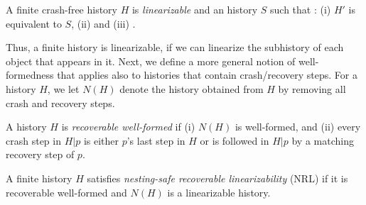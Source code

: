 \begin{definition} 
\label{Definition: Linearizability}
A finite crash-free history $H$ is \emph{linearizable} 
and an  history $S$ such that :
(i) $H'$ is equivalent to $S$,
(ii)  and
(iii) .
\end{definition}

Thus, a finite history is linearizable, if we can linearize the subhistory
of each object that appears in it.
Next, we define a more general notion of well-formedness that applies also
to histories that contain crash/recovery steps. For a history $H$,
we let $N(H)$ denote the history obtained from $H$ by removing all crash and recovery steps.

\begin{definition}%
\label{def:recoverable-well-formedness}
A history $H$ is \textit{recoverable well-formed} if (i) $N(H)$ is well-formed,
and (ii)
every crash step in $H | p$ is either $p$'s last step in $H$ or is followed in $H | p$ by a matching recovery step of $p$.
\end{definition}


\begin{definition}%
\label{Definition:NRL}
A finite history $H$ satisfies \emph{nesting-safe recoverable linearizability} (NRL)
if it is recoverable well-formed and $N(H)$ is a linearizable history.
\end{definition}


